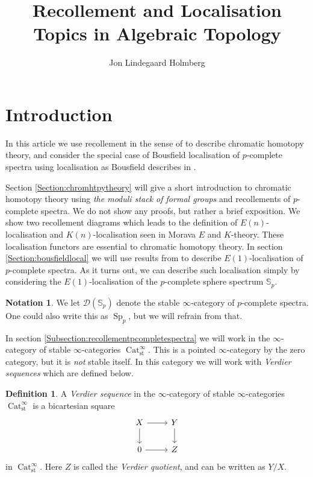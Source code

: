 \documentclass[a4paper]{article} %
\author{Jon Lindegaard Holmberg}
\title{Recollement and Localisation\\Topics in Algebraic Topology}
\theoremstyle{definition}
\newtheorem{definition}[theorem]{Definition}
\newtheorem*{notation}{Notation}
\newcommand{\Sph}{\mathbb{S}}
\DeclareMathOperator{\Cat}{Cat}         %
\begin{document}
\maketitle

\tableofcontents

\section{Introduction}
In this article we use recollement in the sense of \cite{barwickglasman} to describe chromatic homotopy theory, and consider the special case of Bousfield localisation of $p$-complete spectra using localisation as Bousfield describes in \cite{bousfield1979localization}.

Section \ref{Section:chromhtpytheory} will give a short introduction to chromatic homotopy theory using \textit{the moduli stack of formal groups} and recollements of $p$-complete spectra. We do not show any proofs, but rather a brief exposition. We show two recollement diagrams which leads to the definition of $E(n)$-localisation and $K(n)$-localisation seen in Morava $E$ and $K$-theory. These localisation functors are essential to chromatic homotopy theory. In section \ref{Section:bousfieldlocal} we will use results from \cite{bousfield1979localization}
to describe $E(1)$-localisation of $p$-complete spectra. As it turns out, we can describe such localisation simply by considering the $E(1)$-localisation of the $p$-complete sphere spectrum $\Sph_p$.
\begin{notation}
  We let $\mathcal{D} (\Sph_p)$ denote the stable $\infty$-category of $p$-complete spectra. One could also write this as $\operatorname{Sp}_p$, but we will refrain from that.
\end{notation}
In section \ref{Subsection:recollementpcompletespectra} we will work in the $\infty$-category of stable $\infty$-categories $\Cat_{\text{st}}^\infty$. This is a pointed $\infty$-category by the zero category, but it is \textit{not} stable itself. In this category we will work with \textit{Verdier sequences} which are defined below.

\begin{definition}
  A \textit{Verdier sequence} in the $\infty$-category of stable $\infty$-categories $\Cat_{\text{st}}^\infty$ is a bicartesian square
  \[
    \begin{tikzcd}
      X \arrow{r}{} \arrow{d}{} & Y \arrow{d}{} \\
       0 \arrow{r}{} & Z
    \end{tikzcd}
  \]
  in $\Cat_{\text{st}}^\infty$. Here $Z$ is called the \textit{Verdier quotient}, and can be written as $Y/X$.
\end{definition}
\end{document}
